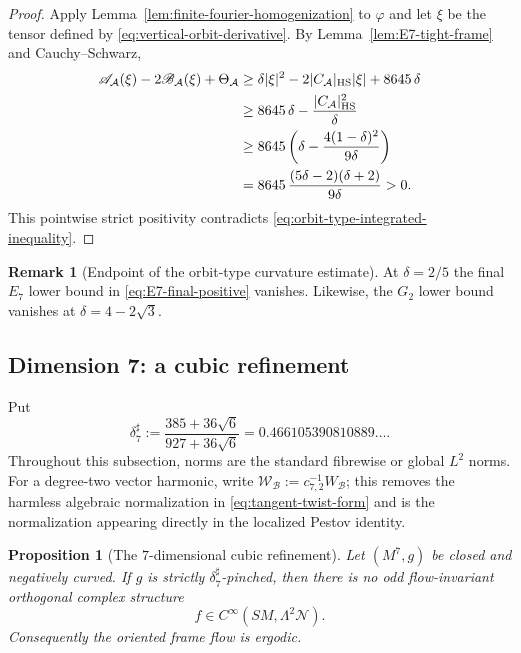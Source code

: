 \documentclass[reqno,11pt]{amsart}
\newtheorem{proposition}[theorem]{Proposition}
\theoremstyle{definition}
\newtheorem{remark}[theorem]{Remark}
\newcommand{\SM}{SM}
\newcommand{\cN}{\mathcal N}
\newcommand{\cA}{\mathcal A}
\newcommand{\cB}{\mathcal B}
\begin{document}
\begin{proof}
Apply Lemma~\ref{lem:finite-fourier-homogenization} to $\varphi$ and let $\xi$
be the tensor defined by \eqref{eq:vertical-orbit-derivative}.  By
Lemma~\ref{lem:E7-tight-frame} and
Cauchy--Schwarz,
\begin{align}
 \mathscr A_{\cA}(\xi)-2\mathscr B_{\cA}(\xi)+\Theta_{\cA}
 &\geq
 \delta|\xi|^2-2|C_{\cA}|_{\mathrm{HS}}|\xi|+8645\,\delta
 \notag\\
 &\geq
 8645\,\delta-\frac{|C_{\cA}|_{\mathrm{HS}}^2}{\delta}
 \notag\\
 &\geq
 8645\left(
  \delta-\frac{4(1-\delta)^2}{9\delta}
 \right)
 \notag\\
 &=8645\,
 \frac{(5\delta-2)(\delta+2)}{9\delta}>0.
 \label{eq:E7-final-positive}
\end{align}
This pointwise strict positivity contradicts
\eqref{eq:orbit-type-integrated-inequality}.
\end{proof}

\begin{remark}[Endpoint of the orbit-type curvature estimate]
\label{rem:E7-endpoint}
At $\delta=2/5$ the final $E_7$ lower bound in
\eqref{eq:E7-final-positive} vanishes.  Likewise, the $G_2$ lower bound
vanishes at $\delta=4-2\sqrt3$. 
\end{remark}

\subsection{Dimension 7: a cubic refinement}
\label{sec:dimension-seven}

Put
\begin{equation*}
  \delta_7^\sharp
  :=\frac{385+36\sqrt6}{927+36\sqrt6}
  =0.466105390810889\ldots.
\end{equation*}
Throughout this subsection, norms are the standard fibrewise or global
$L^2$ norms.  For a degree-two vector harmonic, write
$\mathcal W_{\cB}:=c_{7,2}^{-1}W_{\cB}$; this removes the harmless algebraic
normalization in \eqref{eq:tangent-twist-form} and is the normalization
appearing directly in the localized Pestov identity.

\begin{proposition}[The $7$-dimensional cubic refinement]
\label{prop:dimension-seven-vanishing}
Let $(M^7,g)$ be closed and negatively curved.  If $g$ is strictly
$\delta_7^\sharp$-pinched, then there is no odd flow-invariant orthogonal
complex structure
$$
  f\in C^\infty(\SM,\Lambda^2\cN).
$$
Consequently the oriented frame flow is ergodic.
\end{proposition}
\end{document}
